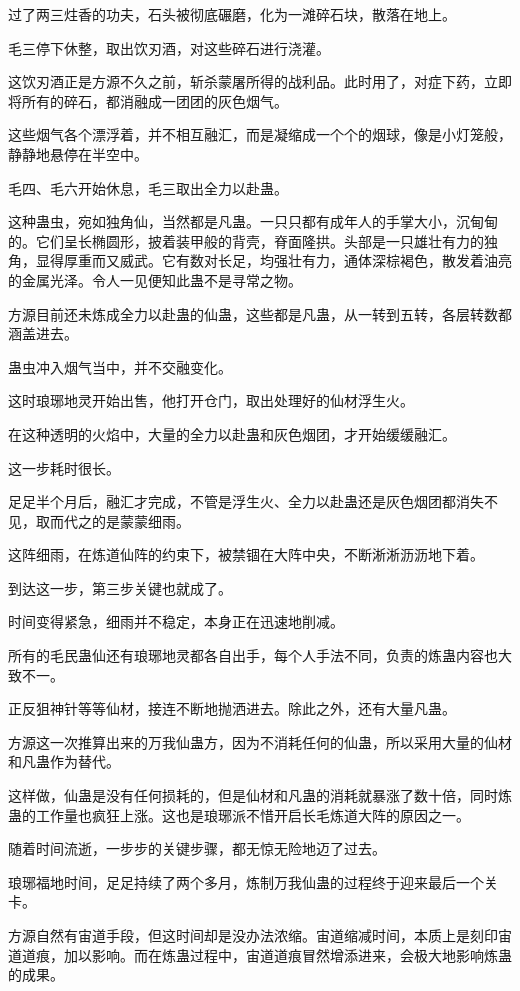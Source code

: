 \begin{this_body}
过了两三炷香的功夫，石头被彻底碾磨，化为一滩碎石块，散落在地上。

毛三停下休整，取出饮刃酒，对这些碎石进行浇灌。

这饮刃酒正是方源不久之前，斩杀蒙屠所得的战利品。此时用了，对症下药，立即将所有的碎石，都消融成一团团的灰色烟气。

这些烟气各个漂浮着，并不相互融汇，而是凝缩成一个个的烟球，像是小灯笼般，静静地悬停在半空中。

毛四、毛六开始休息，毛三取出全力以赴蛊。

这种蛊虫，宛如独角仙，当然都是凡蛊。一只只都有成年人的手掌大小，沉甸甸的。它们呈长椭圆形，披着装甲般的背壳，脊面隆拱。头部是一只雄壮有力的独角，显得厚重而又威武。它有数对长足，均强壮有力，通体深棕褐色，散发着油亮的金属光泽。令人一见便知此蛊不是寻常之物。

方源目前还未炼成全力以赴蛊的仙蛊，这些都是凡蛊，从一转到五转，各层转数都涵盖进去。

蛊虫冲入烟气当中，并不交融变化。

这时琅琊地灵开始出售，他打开仓门，取出处理好的仙材浮生火。

在这种透明的火焰中，大量的全力以赴蛊和灰色烟团，才开始缓缓融汇。

这一步耗时很长。

足足半个月后，融汇才完成，不管是浮生火、全力以赴蛊还是灰色烟团都消失不见，取而代之的是蒙蒙细雨。

这阵细雨，在炼道仙阵的约束下，被禁锢在大阵中央，不断淅淅沥沥地下着。

到达这一步，第三步关键也就成了。

时间变得紧急，细雨并不稳定，本身正在迅速地削减。

所有的毛民蛊仙还有琅琊地灵都各自出手，每个人手法不同，负责的炼蛊内容也大致不一。

正反狙神针等等仙材，接连不断地抛洒进去。除此之外，还有大量凡蛊。

方源这一次推算出来的万我仙蛊方，因为不消耗任何的仙蛊，所以采用大量的仙材和凡蛊作为替代。

这样做，仙蛊是没有任何损耗的，但是仙材和凡蛊的消耗就暴涨了数十倍，同时炼蛊的工作量也疯狂上涨。这也是琅琊派不惜开启长毛炼道大阵的原因之一。

随着时间流逝，一步步的关键步骤，都无惊无险地迈了过去。

琅琊福地时间，足足持续了两个多月，炼制万我仙蛊的过程终于迎来最后一个关卡。

方源自然有宙道手段，但这时间却是没办法浓缩。宙道缩减时间，本质上是刻印宙道道痕，加以影响。而在炼蛊过程中，宙道道痕冒然增添进来，会极大地影响炼蛊的成果。


\end{this_body}
